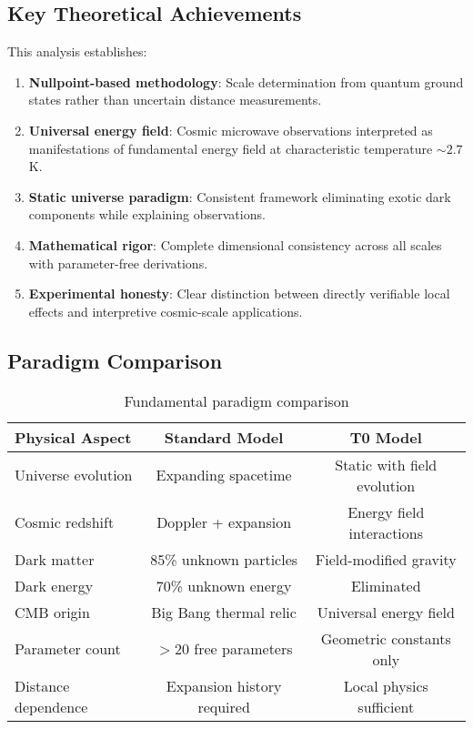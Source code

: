 \documentclass[12pt,a4paper]{article}
\begin{document}
	\subsection{Key Theoretical Achievements}
	\label{subsec:key_achievements}
	
	This analysis establishes:
	
	\begin{enumerate}
		\item \textbf{Nullpoint-based methodology}: Scale determination from quantum ground states rather than uncertain distance measurements.
		
		\item \textbf{Universal energy field}: Cosmic microwave observations interpreted as manifestations of fundamental energy field at characteristic temperature $\sim 2.7$ K.
		
		\item \textbf{Static universe paradigm}: Consistent framework eliminating exotic dark components while explaining observations.
		
		\item \textbf{Mathematical rigor}: Complete dimensional consistency across all scales with parameter-free derivations.
		
		\item \textbf{Experimental honesty}: Clear distinction between directly verifiable local effects and interpretive cosmic-scale applications.
	\end{enumerate}
	
	\subsection{Paradigm Comparison}
	\label{subsec:paradigm_comparison}
	
	\begin{table}[htbp]
		\centering
		\begin{tabular}{|l|c|c|}
			\hline
			\textbf{Physical Aspect} & \textbf{Standard Model} & \textbf{T0 Model} \\
			\hline
			Universe evolution & Expanding spacetime & Static with field evolution \\
			Cosmic redshift & Doppler + expansion & Energy field interactions \\
			Dark matter & 85\% unknown particles & Field-modified gravity \\
			Dark energy & 70\% unknown energy & Eliminated \\
			CMB origin & Big Bang thermal relic & Universal energy field \\
			Parameter count & $>20$ free parameters & Geometric constants only \\
			Distance dependence & Expansion history required & Local physics sufficient \\
			\hline
		\end{tabular}
		\caption{Fundamental paradigm comparison}
		\label{tab:paradigm_final}
	\end{table}
	
\end{document}
